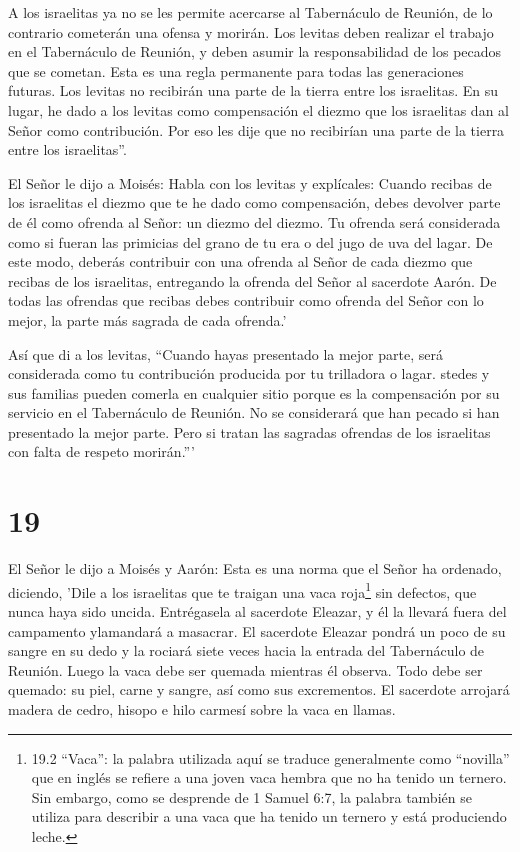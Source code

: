 A los israelitas ya no se les permite acercarse al
Tabernáculo de Reunión, de lo contrario cometerán una ofensa y morirán.
 Los levitas deben realizar el trabajo en el Tabernáculo de
Reunión, y deben asumir la responsabilidad de los pecados que se
cometan. Esta es una regla permanente para todas las generaciones
futuras. Los levitas no recibirán una parte de la tierra entre los
israelitas.  En su lugar, he dado a los levitas como
compensación el diezmo que los israelitas dan al Señor como
contribución. Por eso les dije que no recibirían una parte de la tierra
entre los israelitas''.

 El Señor le dijo a Moisés:  Habla con los
levitas y explícales: Cuando recibas de los israelitas el diezmo que te
he dado como compensación, debes devolver parte de él como ofrenda al
Señor: un diezmo del diezmo.  Tu ofrenda será considerada
como si fueran las primicias del grano de tu era o del jugo de uva del
lagar.  De este modo, deberás contribuir con una ofrenda al
Señor de cada diezmo que recibas de los israelitas, entregando la
ofrenda del Señor al sacerdote Aarón.  De todas las
ofrendas que recibas debes contribuir como ofrenda del Señor con lo
mejor, la parte más sagrada de cada ofrenda.'

 Así que di a los levitas, ``Cuando hayas presentado la
mejor parte, será considerada como tu contribución producida por tu
trilladora o lagar.  stedes y sus familias pueden comerla
en cualquier sitio porque es la compensación por su servicio en el
Tabernáculo de Reunión.  No se considerará que han pecado
si han presentado la mejor parte. Pero si tratan las sagradas ofrendas
de los israelitas con falta de respeto morirán.'''

\hypertarget{section-18}{%
\section{19}\label{section-18}}

 El Señor le dijo a Moisés y Aarón:  Esta es una
norma que el Señor ha ordenado, diciendo, 'Dile a los israelitas que te
traigan una vaca roja\footnote{19.2 ``Vaca'': la palabra utilizada aquí
  se traduce generalmente como ``novilla'' que en inglés se refiere a
  una joven vaca hembra que no ha tenido un ternero. Sin embargo, como
  se desprende de 1 Samuel 6:7, la palabra también se utiliza para
  describir a una vaca que ha tenido un ternero y está produciendo
  leche.} sin defectos, que nunca haya sido uncida. 
Entrégasela al sacerdote Eleazar, y él la llevará fuera del campamento
ylamandará a masacrar.  El sacerdote Eleazar pondrá un poco
de su sangre en su dedo y la rociará siete veces hacia la entrada del
Tabernáculo de Reunión.  Luego la vaca debe ser quemada
mientras él observa. Todo debe ser quemado: su piel, carne y sangre, así
como sus excrementos.  El sacerdote arrojará madera de
cedro, hisopo e hilo carmesí sobre la vaca en llamas.

